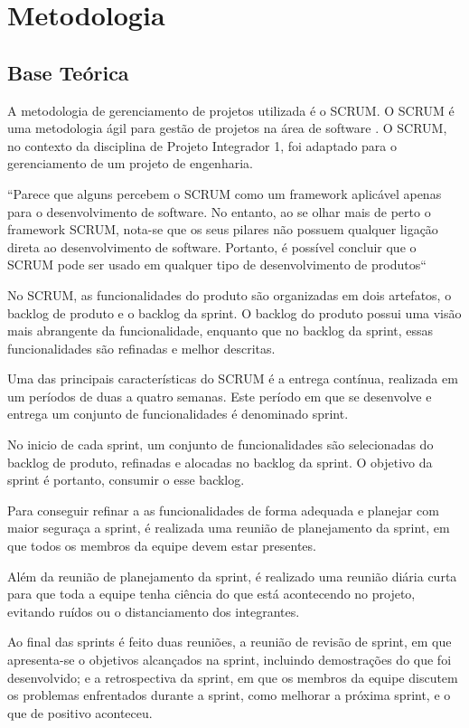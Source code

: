 \section{Metodologia}
\subsection{Base Teórica}
  A metodologia de gerenciamento de projetos utilizada é o SCRUM. O SCRUM é uma metodologia ágil para gestão de projetos na área de software \cite{devagil}. O SCRUM, no contexto da disciplina de Projeto Integrador 1, foi adaptado para o gerenciamento de um projeto de engenharia.

  “Parece que alguns percebem o SCRUM como um framework aplicável apenas para o desenvolvimento de software. No entanto, ao se olhar mais de perto o framework SCRUM, nota-se que os seus pilares não possuem qualquer ligação direta ao desenvolvimento de software. Portanto, é possível concluir que o SCRUM pode ser usado em qualquer tipo de desenvolvimento de produtos“ \cite{scrumineng}

  No SCRUM, as funcionalidades do produto são organizadas em dois artefatos, o backlog de produto e o backlog da sprint. O backlog do produto possui uma visão mais abrangente da funcionalidade, enquanto que no backlog da sprint, essas funcionalidades são refinadas e melhor descritas.

  Uma das principais características do SCRUM é a entrega contínua, realizada em um períodos de duas a quatro semanas. Este período em que se desenvolve e entrega um conjunto de funcionalidades é denominado sprint.

  No inicio de cada sprint, um conjunto de funcionalidades são selecionadas do backlog de produto, refinadas e alocadas no backlog da sprint. O objetivo da sprint é portanto, consumir o esse backlog.

  Para conseguir refinar a as funcionalidades de forma adequada e planejar com maior seguraça a sprint, é realizada uma reunião de planejamento da sprint, em que todos os membros da equipe devem estar presentes.

  Além da reunião de planejamento da sprint, é realizado uma reunião diária curta para que toda a equipe tenha ciência do que está acontecendo no projeto, evitando ruídos ou o distanciamento dos integrantes.

  Ao final das sprints é feito duas reuniões, a reunião de revisão de sprint, em que apresenta-se o objetivos alcançados na sprint, incluindo demostrações do que foi desenvolvido; e a retrospectiva da sprint, em que os membros da equipe discutem os problemas enfrentados durante a sprint, como melhorar a próxima sprint, e o que de positivo aconteceu.
